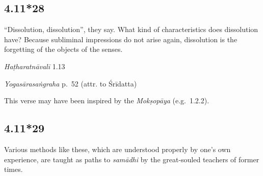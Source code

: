 \begin{ekdosis}

\subsection*{4.11*28}
\begin{translation}[hp04_011_28]
“Dissolution, dissolution”, they say. What kind of characteristics does dissolution have? Because subliminal impressions do not arise again, dissolution is the forgetting of the objects of the senses.
\end{translation}


\begin{testimonia}[hp04_011_28]
\emph{Haṭharatnāvalī} 1.13
\begin{versinnote}
\end{versinnote}

\emph{Yogasārasaṅgraha} p.~52 (attr. to Śrīdatta)
\begin{versinnote}
\end{versinnote}
\end{testimonia}

\begin{philcomm}[hp04_011_28]
This verse may have been inspired by the \emph{Mokṣopāya} (e.g.~1.2.2).
\end{philcomm}

\subsection*{4.11*29}
\begin{translation}[hp04_011_29]
Various methods like these, which are understood properly by one's own experience, are taught as paths to \textit{samādhi} by the great-souled teachers of former times.
\end{translation}



\end{ekdosis}

